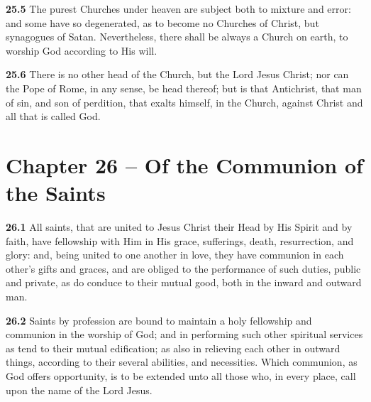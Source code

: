 \par\textbf{25.5} The purest Churches under heaven are subject both to mixture and error: and some have so degenerated, as to become no Churches of Christ, but synagogues of Satan. Nevertheless, there shall be always a Church on earth, to worship God according to His will.   

\par\textbf{25.6} There is no other head of the Church, but the Lord Jesus Christ; nor can the Pope of Rome, in any sense, be head thereof; but is that Antichrist, that man of sin, and son of perdition, that exalts himself, in the Church, against Christ and all that is called God.  

\section{Chapter 26 -- Of the Communion of the Saints}

\par\textbf{26.1} All saints, that are united to Jesus Christ their Head by His Spirit and by faith, have fellowship with Him in His grace, sufferings, death, resurrection, and glory: and, being united to one another in love, they have communion in each other's gifts and graces, and are obliged to the performance of such duties, public and private, as do conduce to their mutual good, both in the inward and outward man.   

\par\textbf{26.2} Saints by profession are bound to maintain a holy fellowship and communion in the worship of God; and in performing such other spiritual services as tend to their mutual edification; as also in relieving each other in outward things, according to their several abilities, and necessities. Which communion, as God offers opportunity, is to be extended unto all those who, in every place, call upon the name of the Lord Jesus.   

